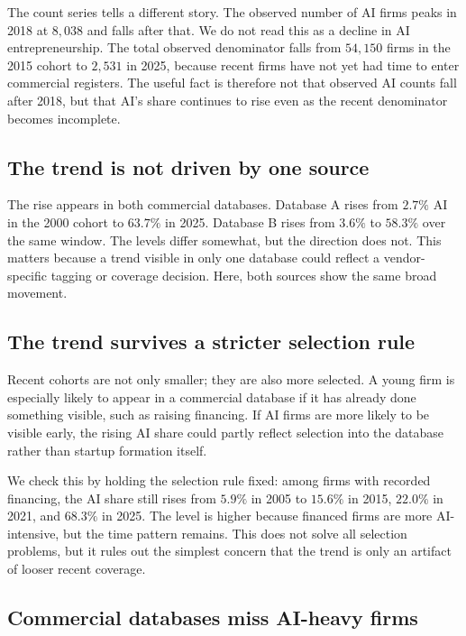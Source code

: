 The count series tells a different story. The observed number of AI firms peaks
in 2018 at $8{,}038$ and falls after that. We do not read this as a decline in
AI entrepreneurship. The total observed denominator falls from $54{,}150$ firms
in the 2015 cohort to $2{,}531$ in 2025, because recent firms have not yet had
time to enter commercial registers. The useful fact is therefore not that
observed AI counts fall after 2018, but that AI's share continues to rise even
as the recent denominator becomes incomplete.

\subsection{The trend is not driven by one source}

The rise appears in both commercial databases. Database A rises from $2.7\%$
AI in the 2000 cohort to $63.7\%$ in 2025. Database B rises from $3.6\%$ to
$58.3\%$ over the same window. The levels differ somewhat, but the direction
does not. This matters because a trend visible in only one database could
reflect a vendor-specific tagging or coverage decision. Here, both sources
show the same broad movement.

\subsection{The trend survives a stricter selection rule}

Recent cohorts are not only smaller; they are also more selected. A young firm
is especially likely to appear in a commercial database if it has already done
something visible, such as raising financing. If AI firms are more likely to be
visible early, the rising AI share could partly reflect selection into the
database rather than startup formation itself.

We check this by holding the selection rule fixed: among firms with recorded
financing, the AI share still rises from $5.9\%$ in 2005 to $15.6\%$ in 2015,
$22.0\%$ in 2021, and $68.3\%$ in 2025. The level is higher because financed
firms are more AI-intensive, but the time pattern remains. This does not solve
all selection problems, but it rules out the simplest concern that the trend is
only an artifact of looser recent coverage.

\subsection{Commercial databases miss AI-heavy firms}

